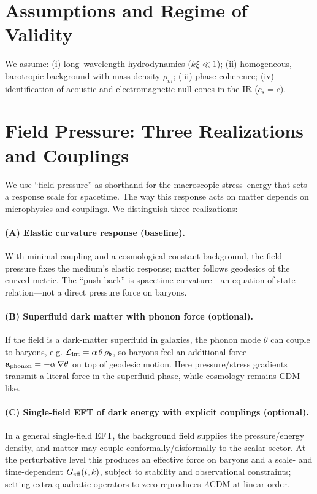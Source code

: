 \documentclass[11pt,a4paper]{article}
\begin{document}
\section{Assumptions and Regime of Validity}
We assume: (i) long--wavelength hydrodynamics ($k\xi\ll1$); (ii) homogeneous, barotropic background with mass density $\rho_m$; (iii) phase coherence; (iv) identification of acoustic and electromagnetic null cones in the IR ($c_s=c$).

\section{Field Pressure: Three Realizations and Couplings}
\label{sec:three-realizations}
We use ``field pressure'' as shorthand for the macroscopic stress--energy that sets a response scale for spacetime. The way this response acts on matter depends on microphysics and couplings. We distinguish three realizations:

\paragraph{(A) Elastic curvature response (baseline).}
With minimal coupling and a cosmological constant background, the field pressure fixes the medium's elastic response; matter follows geodesics of the curved metric. The ``push back'' is spacetime curvature---an equation-of-state relation---not a direct pressure force on baryons.\cite{Jacobson1995,Padmanabhan2004,Sakharov1967}

\paragraph{(B) Superfluid dark matter with phonon force (optional).}
If the field is a dark-matter superfluid in galaxies, the phonon mode $\theta$ can couple to baryons, e.g.
$\mathcal{L}_{\rm int}=\alpha\,\theta\,\rho_b$, so baryons feel an additional force
$\mathbf{a}_{\rm phonon}=-\alpha\,\nabla\theta$ on top of geodesic motion. Here pressure/stress gradients transmit a literal force in the superfluid phase, while cosmology remains CDM-like.\cite{BerezhianiKhoury2015,KhouryPLB2015}

\paragraph{(C) Single-field EFT of dark energy with explicit couplings (optional).}
In a general single-field EFT, the background field supplies the pressure/energy density, and matter may couple conformally/disformally to the scalar sector. At the perturbative level this produces an effective force on baryons and a scale- and time-dependent $G_{\rm eff}(t,k)$, subject to stability and observational constraints; setting extra quadratic operators to zero reproduces $\Lambda$CDM at linear order.\cite{Gubitosi2013}
\end{document}
